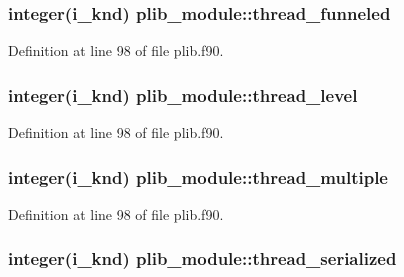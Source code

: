 \hypertarget{classplib__module_aaf61faf216e801843c4b8121eab84956}{
\subsubsection[{thread\-\_\-funneled}]{\setlength{\rightskip}{0pt plus 5cm}integer(i\-\_\-knd) plib\-\_\-module\-::thread\-\_\-funneled}}\label{classplib__module_aaf61faf216e801843c4b8121eab84956}


Definition at line 98 of file plib.\-f90.

\hypertarget{classplib__module_a704c693732d15c474f76b340e3b1c54f}{
\subsubsection[{thread\-\_\-level}]{\setlength{\rightskip}{0pt plus 5cm}integer(i\-\_\-knd) plib\-\_\-module\-::thread\-\_\-level}}\label{classplib__module_a704c693732d15c474f76b340e3b1c54f}


Definition at line 98 of file plib.\-f90.

\hypertarget{classplib__module_af4045f02bfdd6ce98120023046d4c1ca}{
\subsubsection[{thread\-\_\-multiple}]{\setlength{\rightskip}{0pt plus 5cm}integer(i\-\_\-knd) plib\-\_\-module\-::thread\-\_\-multiple}}\label{classplib__module_af4045f02bfdd6ce98120023046d4c1ca}


Definition at line 98 of file plib.\-f90.

\hypertarget{classplib__module_a117ac57a3b41c9fae508f8674fe45f0f}{
\subsubsection[{thread\-\_\-serialized}]{\setlength{\rightskip}{0pt plus 5cm}integer(i\-\_\-knd) plib\-\_\-module\-::thread\-\_\-serialized}}\label{classplib__module_a117ac57a3b41c9fae508f8674fe45f0f}



